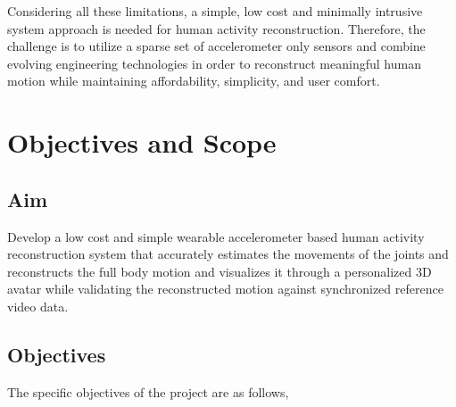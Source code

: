 \documentclass[12pt, a4paper, oneside]{report}
\begin{document}
\noindent Considering all these limitations, a simple, low cost and minimally intrusive system approach is needed for human activity reconstruction. Therefore, the challenge is to utilize a sparse set of accelerometer only sensors and combine evolving engineering technologies in order to reconstruct meaningful human motion while maintaining affordability, simplicity, and user comfort.\vspace{\baselineskip}

\section{Objectives and Scope}

\subsection{Aim}

\noindent Develop a low cost and simple wearable accelerometer based human activity reconstruction system that accurately estimates the movements of the joints and reconstructs the full body motion and visualizes it through a personalized 3D avatar while validating the reconstructed motion against synchronized reference video data.\vspace{\baselineskip}

\subsection{Objectives}

\noindent The specific objectives of the project are as follows,
\vspace{\baselineskip}
\end{document}
